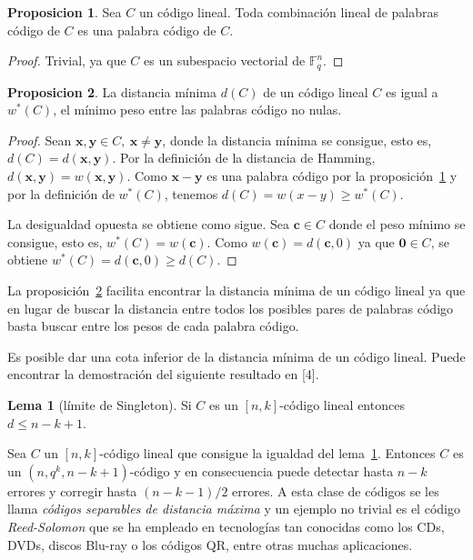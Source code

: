 \documentclass[a4paper,11pt]{article}
\numberwithin{equation}{section}
\theoremstyle{definition} %
\newtheorem{proposicion}{Proposicion}[section]
\newtheorem{lema}{Lema}[section]
\newcommand{\x}{\mathbf{x}}
\newcommand{\y}{\mathbf{y}}
\renewcommand{\c}{\mathbf{c}}
\newcommand{\Fqn}{\mathbb{F}_q^n}
\begin{document}
    \begin{proposicion}
        \label{th:linealidad}
        Sea $C$ un código lineal. Toda combinación lineal de palabras código de $C$ es una palabra código de $C$.
    \end{proposicion}
    \begin{proof}
        Trivial, ya que $C$ es un subespacio vectorial de $\Fqn$.
    \end{proof}

    \begin{proposicion}
        \label{th:distancia_codigo_lineal}
        La distancia mínima $d(C)$ de un código lineal $C$ es igual a $w^*(C)$, el mínimo peso entre las palabras código no nulas.
    \end{proposicion}
    \begin{proof}
        Sean $\x, \y \in C,\ \x \neq \y$, donde la distancia mínima se consigue, esto es, $d(C) = d(\x, \y)$. Por la definición de la distancia de Hamming, $d(\x, \y) = w(\x, \y)$. Como $\x - \y$ es una palabra código por la proposición~\ref{th:linealidad} y por la definición de $w^*(C)$, tenemos $d(C) = w(x - y) \geq w^*(C)$.

        La desigualdad opuesta se obtiene como sigue. Sea $\c \in C$ donde el peso mínimo se consigue, esto es, $w^*(C) = w(\c)$. Como $w(\c) = d(\c, 0)$ ya que $\mathbf{0} \in C$, se obtiene $w^*(C) = d(\c, 0) \geq d(C)$.
    \end{proof}

    La proposición~\ref{th:distancia_codigo_lineal} facilita encontrar la distancia mínima de un código lineal ya que en lugar de buscar la distancia entre todos los posibles pares de palabras código basta buscar entre los pesos de cada palabra código.

    Es posible dar una cota inferior de la distancia mínima de un código lineal. Puede encontrar la demostración del siguiente resultado en [4].

    \begin{lema}[límite de Singleton]
        \label{lm:singleton}
        Si $C$ es un $[n, k]$-código lineal entonces $d \leq n - k + 1$.
    \end{lema}

    Sea $C$ un $[n, k]$-código lineal que consigue la igualdad del lema~\ref{lm:singleton}. Entonces $C$ es un $(n, q^k, n-k+1)$-código y en consecuencia puede detectar hasta $n - k$ errores y corregir hasta $(n - k - 1)/2$ errores. A esta clase de códigos se les llama \emph{códigos separables de distancia máxima} y un ejemplo no trivial es el código \emph{Reed-Solomon} que se ha empleado en tecnologías tan conocidas como los CDs, DVDs, discos Blu-ray o los códigos QR, entre otras muchas aplicaciones.
\end{document}
